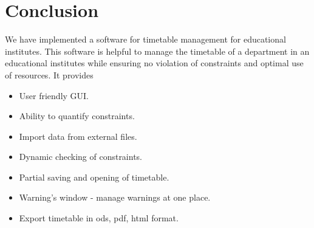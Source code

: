 %

\chapter{Conclusion}
We have implemented a software for timetable management for educational institutes. This software is helpful to manage  the timetable of a department in an educational institutes while ensuring no violation of constraints and optimal use of resources.
It provides
\begin{itemize}
\item User friendly GUI.
\item Ability to quantify constraints.
\item Import data from external files.
\item Dynamic checking of constraints.
\item Partial saving and opening of timetable.
\item Warning's window - manage warnings at one place.
\item Export timetable in ods, pdf, html format.
\end{itemize}



			


 
 
